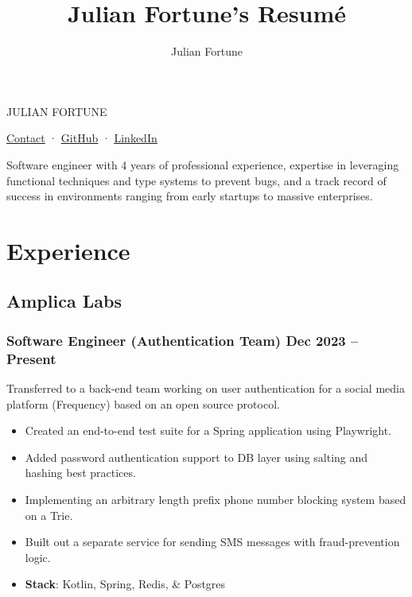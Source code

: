 \documentclass[12pt]{article} %
\title{Julian Fortune's Resumé}
\author{Julian Fortune}
\providecommand{\tightlist}{%
  \setlength{\itemsep}{0pt}\setlength{\parskip}{0pt}}
\let\defaultref\href
\renewcommand{\href}[2]{%
  \defaultref{#1}{\ul{#2}}%
}
\newcommand{\link}[2]{\href{#1}{#2}}
\def\separator{ · {}}
\begin{document}
\begin{bfseries}\begin{huge}
  {\selectfont%
    \MakeTextUppercase{Julian Fortune}
  }
\end{huge}\end{bfseries}

  \link{https://forms.gle/KkSirNbEgQozTH2x7}{Contact}\separator%
    \link{http://github.com/julianfortune}{GitHub}\separator%
\link{http://linkedin.com/in/julianfortune}{LinkedIn}%


\vspace{0.5em}

Software engineer with 4 years of professional experience, expertise in
leveraging functional techniques and type systems to prevent bugs, and a
track record of success in environments ranging from early startups to
massive enterprises.

\hypertarget{experience}{%
\section{Experience}\label{experience}}

\hypertarget{amplica-labs}{%
\subsection{Amplica Labs}\label{amplica-labs}}

\vspace{-5pt}

\hypertarget{software-engineer-authentication-team-dec-2023-present}{%
\subsubsection{\texorpdfstring{\small Software Engineer (Authentication
Team) \hfill Dec 2023 --
Present}{Software Engineer (Authentication Team) Dec 2023 -- Present}}\label{software-engineer-authentication-team-dec-2023-present}}

Transferred to a back-end team working on user authentication for a
social media platform (Frequency) based on an open source protocol.

\begin{itemize}
\tightlist
\item
  Created an end-to-end test suite for a Spring application using
  Playwright.
\item
  Added password authentication support to DB layer using salting and
  hashing best practices.
\item
  Implementing an arbitrary length prefix phone number blocking system
  based on a Trie.
\item
  Built out a separate service for sending SMS messages with
  fraud-prevention logic.
\item
  \textbf{Stack}: Kotlin, Spring, Redis, \& Postgres
\end{itemize}
\end{document}
